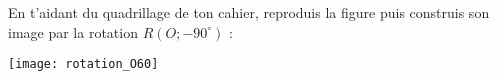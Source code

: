 \begin{methode*1}[La rotation]
 \exercice
 En t'aidant du quadrillage de ton cahier, reproduis la figure puis construis son image par la rotation $R(O ; -90^\circ)$ : \\[0.5em]
 \begin{center} \texttt{[image: rotation\_O60]} \end{center}

 \end{methode*1}
 
